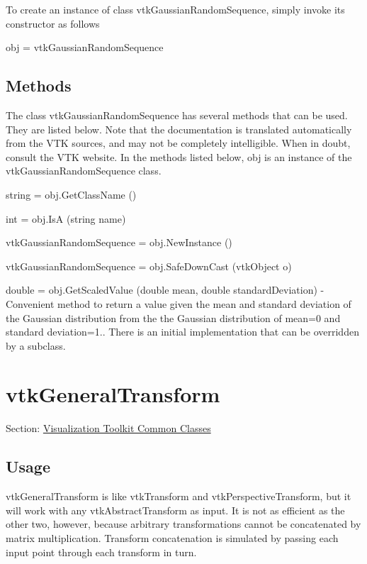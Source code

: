 To create an instance of class vtk\-Gaussian\-Random\-Sequence, simply invoke its constructor as follows \begin{DoxyVerb}  obj = vtkGaussianRandomSequence
\end{DoxyVerb}
 \hypertarget{vtkwidgets_vtkxyplotwidget_Methods}{}\subsection{Methods}\label{vtkwidgets_vtkxyplotwidget_Methods}
The class vtk\-Gaussian\-Random\-Sequence has several methods that can be used. They are listed below. Note that the documentation is translated automatically from the V\-T\-K sources, and may not be completely intelligible. When in doubt, consult the V\-T\-K website. In the methods listed below, {\ttfamily obj} is an instance of the vtk\-Gaussian\-Random\-Sequence class. 
\begin{DoxyItemize}
\item {\ttfamily string = obj.\-Get\-Class\-Name ()}  
\item {\ttfamily int = obj.\-Is\-A (string name)}  
\item {\ttfamily vtk\-Gaussian\-Random\-Sequence = obj.\-New\-Instance ()}  
\item {\ttfamily vtk\-Gaussian\-Random\-Sequence = obj.\-Safe\-Down\-Cast (vtk\-Object o)}  
\item {\ttfamily double = obj.\-Get\-Scaled\-Value (double mean, double standard\-Deviation)} -\/ Convenient method to return a value given the mean and standard deviation of the Gaussian distribution from the the Gaussian distribution of mean=0 and standard deviation=1.. There is an initial implementation that can be overridden by a subclass.  
\end{DoxyItemize}\hypertarget{vtkcommon_vtkgeneraltransform}{}\section{vtk\-General\-Transform}\label{vtkcommon_vtkgeneraltransform}
Section\-: \hyperlink{sec_vtkcommon}{Visualization Toolkit Common Classes} \hypertarget{vtkwidgets_vtkxyplotwidget_Usage}{}\subsection{Usage}\label{vtkwidgets_vtkxyplotwidget_Usage}
vtk\-General\-Transform is like vtk\-Transform and vtk\-Perspective\-Transform, but it will work with any vtk\-Abstract\-Transform as input. It is not as efficient as the other two, however, because arbitrary transformations cannot be concatenated by matrix multiplication. Transform concatenation is simulated by passing each input point through each transform in turn.

